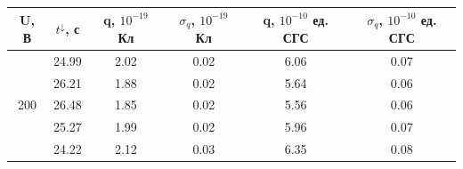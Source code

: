 \documentclass[14pt, a4paper,reqno]{article}
\begin{document}
    \begin{center}
    \begin{tabular}{|c|c|c|c|c|c|}
        \hline
        U, В & $t^{\downarrow}$, с & q, $10^{-19}$ Кл & $\sigma_q$, $10^{-19}$ Кл & q, $10^{-10}$ ед. СГС & $\sigma_q$, $10^{-10}$ ед. СГС \\ \hline\hline
        \multirow{5}{*}{200} & 24.99  &  2.02  &  0.02  & 6.06  & 0.07 \\ \hhline{~-----} 
                             & 26.21  &  1.88  &  0.02  & 5.64  & 0.06 \\ \hhline{~-----}
                             & 26.48  &  1.85  &  0.02  & 5.56  & 0.06 \\ \hhline{~-----}
                             & 25.27  &  1.99  &  0.02  & 5.96  & 0.07 \\ \hhline{~-----}
                             & 24.22  &  2.12  &  0.03  & 6.35  & 0.08 \\ \hline

    \end{tabular}
    \end{center}
\end{document}
